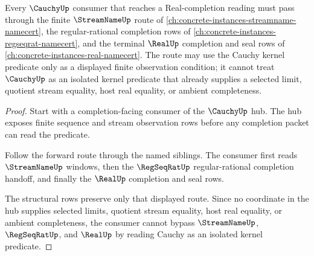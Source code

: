 \begin{theorem}
\label{thm:cauchy-forward-real-completion-route}
Every $\CauchyUp$ consumer that reaches a Real-completion reading must pass through the finite $\StreamNameUp$ route of \autoref{ch:concrete-instances-streamname-namecert}, the regular-rational completion rows of \autoref{ch:concrete-instances-regseqrat-namecert}, and the terminal $\RealUp$ completion and seal rows of \autoref{ch:concrete-instances-real-namecert}. The route may use the Cauchy kernel predicate only as a displayed finite observation condition; it cannot treat $\CauchyUp$ as an isolated kernel predicate that already supplies a selected limit, quotient stream equality, host real equality, or ambient completeness.
\end{theorem}
\begin{proof}
Start with a completion-facing consumer of the $\CauchyUp$ hub. The hub exposes finite sequence and stream observation rows before any completion packet can read the predicate.

Follow the forward route through the named siblings. The consumer first reads $\StreamNameUp$ windows, then the $\RegSeqRatUp$ regular-rational completion handoff, and finally the $\RealUp$ completion and seal rows.

The structural rows preserve only that displayed route. Since no coordinate in the hub supplies selected limits, quotient stream equality, host real equality, or ambient completeness, the consumer cannot bypass $\StreamNameUp$, $\RegSeqRatUp$, and $\RealUp$ by reading Cauchy as an isolated kernel predicate.
\end{proof}
